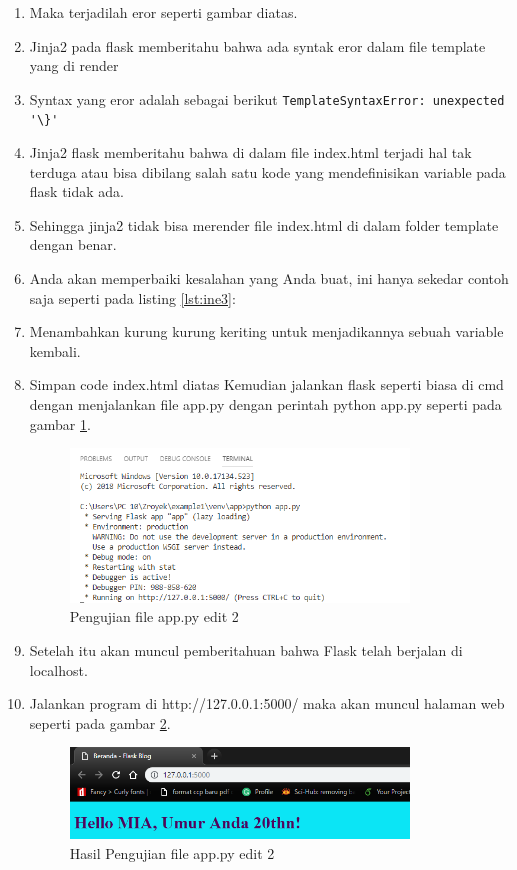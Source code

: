 \begin{enumerate}
\item Maka terjadilah eror seperti gambar diatas.
\item Jinja2 pada flask memberitahu bahwa ada syntak eror dalam file template yang di render
\item Syntax yang eror adalah sebagai berikut 
\verb|TemplateSyntaxError: unexpected '\}'|
\item Jinja2 flask memberitahu bahwa di dalam file index.html terjadi hal tak terduga atau bisa dibilang salah satu kode yang mendefinisikan variable pada flask tidak ada.
\item Sehingga jinja2 tidak bisa merender file index.html di dalam folder template dengan benar.
\item Anda akan memperbaiki kesalahan yang  Anda buat, ini hanya sekedar contoh saja  seperti pada listing \ref{lst:ine3}:


\item Menambahkan kurung kurung keriting  untuk menjadikannya sebuah variable kembali.
\item Simpan code index.html diatas Kemudian jalankan flask seperti biasa di cmd dengan menjalankan file app.py dengan perintah python app.py seperti pada gambar \ref{fig:ufae2}.
\begin{figure}[!htbp]
	\centerline{\includegraphics[width=0.85\textwidth]{figures/13/ufae2.PNG}}
	\caption{Pengujian file app.py edit 2}
	\label{fig:ufae2}
\end{figure}

\item Setelah itu akan muncul pemberitahuan bahwa Flask telah berjalan di localhost.
\item Jalankan program di http://127.0.0.1:5000/ maka akan muncul halaman web seperti pada gambar \ref{fig:hfae}.
\begin{figure}[!htbp]
	\centerline{\includegraphics[width=0.85\textwidth]{figures/13/hfae.PNG}}
	\caption{Hasil Pengujian file app.py edit 2}
	\label{fig:hfae}
\end{figure}


\end{enumerate}
